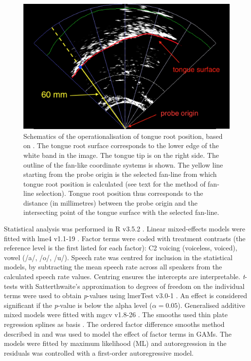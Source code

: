 \documentclass[
  12pt,
]{article}
\begin{document}
\begin{figure}
  \centering
  \includegraphics[width=5in]{./fig/trp.png}
  \caption{Schematics of the operationalisation of tongue root position, based on \citet{kirkham2017}. The tongue root surface corresponds to the lower edge of the white band in the image. The tongue tip is on the right side. The outline of the fan-like coordinate systems is shown. The yellow line starting from the probe origin is the selected fan-line from which tongue root position is calculated (see text for the method of fan-line selection). Tongue root position thus corresponds to the distance (in millimetres) between the probe origin and the intersecting point of the tongue surface with the selected fan-line.}
  \label{f:trp}
\end{figure}

Statistical analysis was performed in R v3.5.2 \citep{r-core-team2018}.
Linear mixed-effects models were fitted with lme4 v1.1-19
\citep{bates2015}. Factor terms were coded with treatment contrasts (the
reference level is the first listed for each factor): C2 voicing
(voiceless, voiced), vowel (/a/, /o/, /u/). Speech rate was centred for
inclusion in the statistical models, by subtracting the mean speech rate
across all speakers from the calculated speech rate values. Centring
ensures the intercepts are interpretable. \emph{t}-tests with
Satterthwaite's approximation to degrees of freedom on the individual
terms were used to obtain \emph{p}-values using lmerTest v3.0-1
\citep{kuznetsova2017, luke2017}. An effect is considered significant if
the \emph{p}-value is below the alpha level (\(\alpha = 0.05\)).
Generalised additive mixed models were fitted with mgcv v1.8-26
\citep{wood2011, wood2017}. The smooths used thin plate regression
splines as basis \citep{wood2003}. The ordered factor difference smooths
method described in \citet{soskuthy2017} and \citet{wieling2018} was
used to model the effect of factor terms in GAMs. The models were fitted
by maximum likelihood (ML) and autoregression in the residuals was
controlled with a first-order autoregressive model.
\end{document}

